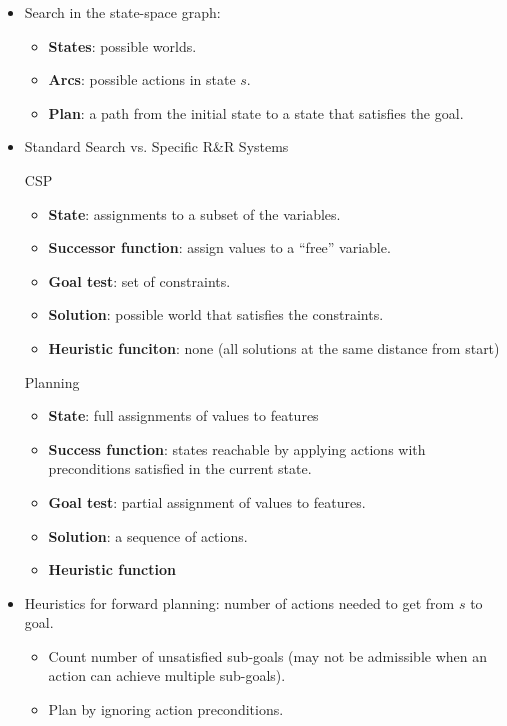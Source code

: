 \documentclass{article}
\begin{document}
\begin{itemize}
    \item Search in the state-space graph:
        \begin{itemize}
            \item \textbf{States}: possible worlds.
            \item \textbf{Arcs}: possible actions in state $s$.
            \item \textbf{Plan}: a path from the initial state to a state that satisfies the goal.
        \end{itemize}
    \item Standard Search vs. Specific R\&R Systems
        \begin{multicols}{2}
            CSP
            \begin{itemize}
                \item \textbf{State}: assignments to a subset of the variables.
                \item \textbf{Successor function}: assign values to a ``free'' variable.
                \item \textbf{Goal test}: set of constraints.
                \item \textbf{Solution}: possible world that satisfies the constraints.
                \item \textbf{Heuristic funciton}: none (all solutions at the same distance from start)
            \end{itemize}
            
            \columnbreak
            
            Planning
            \begin{itemize}
                \item \textbf{State}: full assignments of values to features
                \item \textbf{Success function}: states reachable by applying actions with preconditions satisfied in the current state.
                \item \textbf{Goal test}: partial assignment of values to features.
                \item \textbf{Solution}: a sequence of actions.
                \item \textbf{Heuristic function}
            \end{itemize}
        \end{multicols}
        \item Heuristics for forward planning: number of actions needed to get from $s$ to goal.
            \begin{itemize}
                \item Count number of unsatisfied sub-goals (may not be admissible when an action can achieve multiple sub-goals).
                \item Plan by ignoring action preconditions.
            \end{itemize}
\end{itemize}
\end{document}
